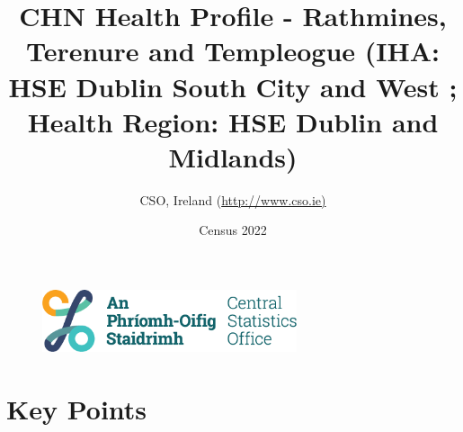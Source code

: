 \documentclass{article}
\title{CHN Health Profile - Rathmines, Terenure and Templeogue (IHA: HSE Dublin South City and West ;  Health Region: HSE Dublin and Midlands) }
\date{Census 2022}
\author{CSO, Ireland  (\url{http://www.cso.ie)}}
\begin{document}


\begin{figure}
	\centering
\includegraphics[width =75mm]{../figures/CSO_Logo.png}
\end{figure}

				 
		   
						  
														  
																																													
												 
			 
\maketitle
					
													   
				 
						 
																																																																											   
				 
				  
  \pagebreak
    	    \tableofcontents

\pagebreak


\section{Key Points}
\end{document}
